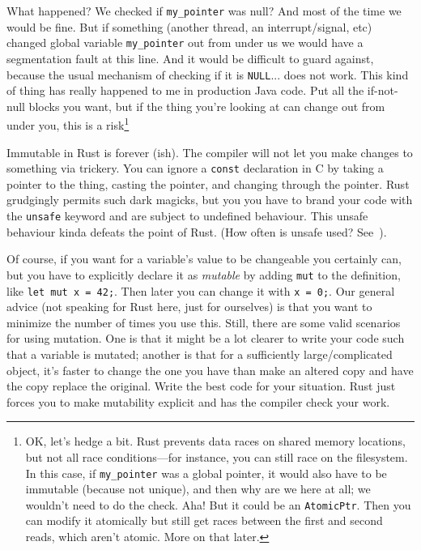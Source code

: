 \documentclass[a4paper]{report}
\begin{document}
What happened? We checked if \texttt{my\_pointer} was null? And most of the time we would be fine. But if something (another thread, an interrupt/signal, etc) changed global variable \texttt{my\_pointer} out from under us we would have a segmentation fault at this line. And it would be difficult to guard against, because the usual mechanism of checking if it is \texttt{NULL}... does not work. This kind of thing has really happened to me in production Java code. Put all the if-not-null blocks you want, but if the thing you're looking at can change out from under you, this is a risk\footnote{OK, let's hedge a bit. Rust prevents data races on shared memory locations, but not all race conditions---for instance, you can still race on the filesystem. In this case, if \texttt{my\_pointer} was a global pointer, it would also have to be immutable (because not unique), and then why are we here at all; we wouldn't need to do the check. Aha! But it could be an \texttt{AtomicPtr}. Then you can modify it atomically but still get races between the first and second reads, which aren't atomic. More on that later.}

Immutable in Rust is forever (ish). The compiler will not let you make changes to something via trickery. You can ignore a \texttt{const} declaration in C by taking a pointer to the thing, casting the pointer, and changing through the pointer. Rust grudgingly permits such dark magicks, but you you have to brand your code with the \texttt{unsafe} keyword and are subject to undefined behaviour. This unsafe behaviour kinda defeats the point of Rust. (How often is unsafe used? See~\cite{astrauskas20:_how_progr_unsaf_rust}).

Of course, if you want for a variable's value to be changeable you certainly can, but you have to explicitly declare it as \textit{mutable} by adding \texttt{mut} to the definition, like \texttt{let mut x = 42;}. Then later you can change it with \texttt{x = 0;}. Our general advice (not speaking for Rust here, just for ourselves) is that you want to minimize the number of times you use this. Still, there are some valid scenarios for using mutation. One is that it might be a lot clearer to write your code such that a variable is mutated; another is that for a sufficiently large/complicated object, it's faster to change the one you have than make an altered copy and have the copy replace the original. Write the best code for your situation. Rust just forces you to make mutability explicit and has the compiler check your work.
\end{document}
